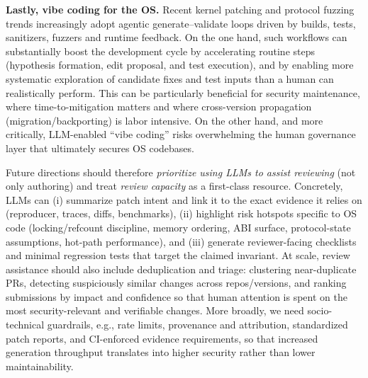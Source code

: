 \textbf{Lastly, vibe coding for the OS.}
Recent kernel patching and protocol fuzzing trends increasingly adopt agentic generate--validate loops driven by builds, tests, sanitizers, fuzzers and runtime feedback. 
On the one hand, such workflows can substantially boost the development cycle by accelerating routine steps (hypothesis formation, edit proposal, and test execution), and by enabling more systematic exploration of candidate fixes and test inputs than a human can realistically perform.
This can be particularly beneficial for security maintenance, where time-to-mitigation matters and where cross-version propagation (migration/backporting) is labor intensive.
On the other hand, and more critically, LLM-enabled ``vibe coding'' risks overwhelming the human governance layer that ultimately secures OS codebases.

Future directions should therefore \emph{prioritize using LLMs to assist reviewing} (not only authoring) and treat \emph{review capacity} as a first-class resource.
Concretely, LLMs can (i) summarize patch intent and link it to the exact evidence it relies on (reproducer, traces, diffs, benchmarks), (ii) highlight risk hotspots specific to OS code (locking/refcount discipline, memory ordering, ABI surface, protocol-state assumptions, hot-path performance), and (iii) generate reviewer-facing checklists and minimal regression tests that target the claimed invariant.
At scale, review assistance should also include deduplication and triage: clustering near-duplicate PRs, detecting suspiciously similar changes across repos/versions, and ranking submissions by impact and confidence so that human attention is spent on the most security-relevant and verifiable changes.
More broadly, we need socio-technical guardrails, e.g., rate limits, provenance and attribution, standardized patch reports, and CI-enforced evidence requirements, so that increased generation throughput translates into higher security rather than lower maintainability.




